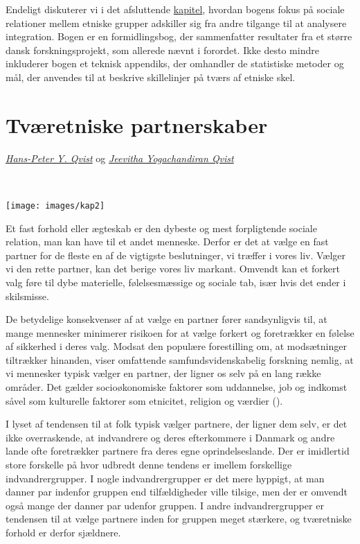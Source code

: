 \documentclass[
]{book}
\begin{document}
Endeligt diskuterer vi i det afsluttende \hyperref[kap7]{kapitel}, hvordan bogens fokus på sociale relationer mellem etniske grupper adskiller sig fra andre tilgange til at analysere integration. Bogen er en formidlingsbog, der sammenfatter resultater fra et større dansk forskningsprojekt, som allerede nævnt i forordet. Ikke desto mindre inkluderer bogen et teknisk appendiks, der omhandler de statistiske metoder og mål, der anvendes til at beskrive skillelinjer på tværs af etniske skel.

\newpage
\thispagestyle{empty}

\chapter{Tværetniske partnerskaber}\label{kap2}

\thispagestyle{empty}

\emph{\href{https://vbn.aau.dk/da/persons/hpq}{Hans-Peter Y. Qvist}} og \emph{\href{https://vbn.aau.dk/da/persons/jy}{Jeevitha Yogachandiran Qvist}}

~~~~

\texttt{[image: images/kap2]}

\newpage

Et fast forhold eller ægteskab er den dybeste og mest forpligtende sociale relation, man kan have til et andet menneske. Derfor er det at vælge en fast partner for de fleste en af de vigtigste beslutninger, vi træffer i vores liv. Vælger vi den rette partner, kan det berige vores liv markant. Omvendt kan et forkert valg føre til dybe materielle, følelsesmæssige og sociale tab, især hvis det ender i skilsmisse.

De betydelige konsekvenser af at vælge en partner fører sandsynligvis til, at mange mennesker minimerer risikoen for at vælge forkert og foretrækker en følelse af sikkerhed i deres valg. Modsat den populære forestilling om, at modsætninger tiltrækker hinanden, viser omfattende samfundsvidenskabelig forskning nemlig, at vi mennesker typisk vælger en partner, der ligner os selv på en lang række områder. Det gælder socioøkonomiske faktorer som uddannelse, job og indkomst såvel som kulturelle faktorer som etnicitet, religion og værdier ().

I lyset af tendensen til at folk typisk vælger partnere, der ligner dem selv, er det ikke overraskende, at indvandrere og deres efterkommere i Danmark og andre lande ofte foretrækker partnere fra deres egne oprindelseslande. Der er imidlertid store forskelle på hvor udbredt denne tendens er imellem forskellige indvandrergrupper. I nogle indvandrergrupper er det mere hyppigt, at man danner par indenfor gruppen end tilfældigheder ville tilsige, men der er omvendt også mange der danner par udenfor gruppen. I andre indvandrergrupper er tendensen til at vælge partnere inden for gruppen meget stærkere, og tværetniske forhold er derfor sjældnere.
\end{document}

